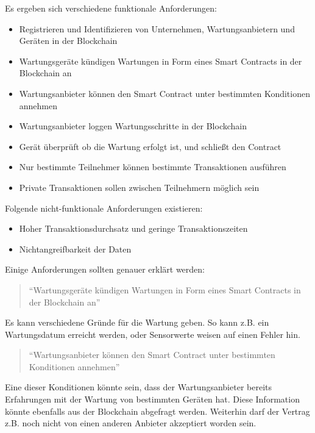 Es ergeben sich verschiedene funktionale Anforderungen:
\begin{itemize}
    \item Registrieren und Identifizieren von Unternehmen, Wartungsanbietern und Geräten in der Blockchain
    \item Wartungsgeräte kündigen Wartungen in Form eines Smart Contracts in der Blockchain an
    \item Wartungsanbieter können den Smart Contract unter bestimmten Konditionen annehmen
    \item Wartungsanbieter loggen Wartungsschritte in der Blockchain
    \item Gerät überprüft ob die Wartung erfolgt ist, und schließt den Contract
    \item Nur bestimmte Teilnehmer können bestimmte Transaktionen ausführen
    \item Private Transaktionen sollen zwischen Teilnehmern möglich sein
\end{itemize}

Folgende nicht-funktionale Anforderungen existieren:

\begin{itemize}
    \item Hoher Transaktionsdurchsatz und geringe Transaktionszeiten
    \item Nichtangreifbarkeit der Daten
\end{itemize}

Einige Anforderungen sollten genauer erklärt werden:

\begin{quote}
    ``Wartungsgeräte kündigen Wartungen in Form eines Smart Contracts in der Blockchain an''
\end{quote}

Es kann verschiedene Gründe für die Wartung geben. So kann z.B. ein Wartungsdatum erreicht werden, oder Sensorwerte weisen auf einen Fehler hin.

\begin{quote}
    ``Wartungsanbieter können den Smart Contract unter bestimmten Konditionen annehmen''
\end{quote}

Eine dieser Konditionen könnte sein, dass der Wartungsanbieter bereits Erfahrungen mit der Wartung von bestimmten Geräten hat. Diese Information könnte ebenfalls aus der Blockchain abgefragt werden. Weiterhin darf der Vertrag z.B. noch nicht von einen anderen Anbieter akzeptiert worden sein. 

